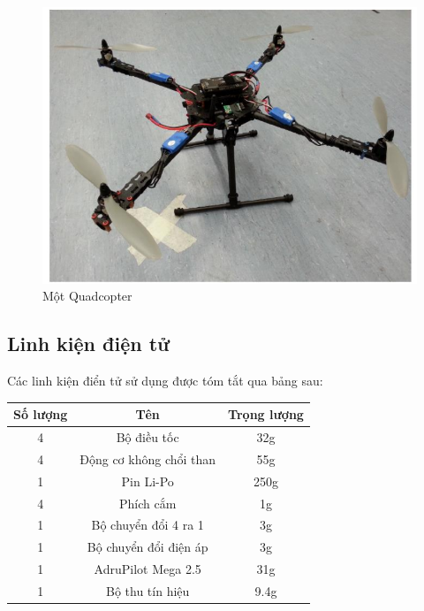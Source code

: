        \begin{figure}[h!]
	        	\begin{center}
	        		\includegraphics[scale=0.8]{images/Cuong-Quadcopter.png}
	        		\caption{Một Quadcopter}
	        	\end{center}
        \end{figure}
        
    	\subsection{Linh kiện điện tử}
Các linh kiện điển tử sử dụng được tóm tắt qua bảng sau:
\begin{tabular}{|c|c|c|}
\hline 
Số lượng & Tên & Trọng lượng \\ 
\hline 
4 & Bộ điều tốc & 32g \\ 
\hline 
4 & Động cơ không chổi than & 55g \\ 
\hline 
1 & Pin Li-Po & 250g \\ 
\hline 
4 & Phích cắm & 1g \\ 
\hline 
1 & Bộ chuyển đổi 4 ra 1 & 3g \\ 
\hline 
1 & Bộ chuyển đổi điện áp & 3g \\ 
\hline 
1 & AdruPilot Mega 2.5 & 31g \\ 
\hline 
1 & Bộ thu tín hiệu & 9.4g \\ 
\hline 
\end{tabular} 

